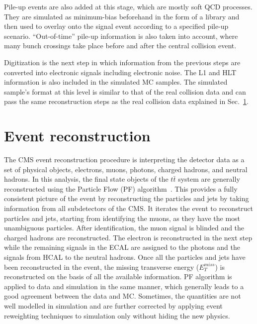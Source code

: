 Pile-up events are also added at this stage, which are mostly soft QCD processes. They are simulated as minimum-bias beforehand in the form of a library and then used to overlay onto the signal event according to a specified pile-up scenario. ``Out-of-time'' pile-up information is also taken into account, where many bunch crossings take place before and after the central collision event. 

Digitization is the next step in which information from the previous steps are converted into electronic signals including electronic noise. The L1 and HLT information is also included in the simulated MC samples. The simulated sample's format at this level is similar to that of the real collision data and can pass the same reconstruction steps as the real collision data explained in Sec.~\ref{sec_recons}.  

\section{Event reconstruction}\label{sec_recons}
The CMS event reconstruction procedure is interpreting the detector data as a set of physical objects, electrons, muons, photons, charged hadrons, and neutral hadrons. In this analysis, the final state objects of the $t\bar t$ system are generally reconstructed using the Particle Flow (PF) algorithm~\cite{Beaudette:2014cea}. This provides a fully consistent picture of the event by reconstructing the particles and jets by taking information from all subdetectors of the CMS. It iterates the event to reconstruct particles and jets, starting from identifying the muons, as they have the most unambiguous particles. After identification, the muon signal is blinded and the charged hadrons are reconstructed. The electron is reconstructed in the next step while the remaining signals in the ECAL are assigned to the photons and the signals from HCAL to the neutral hadrons. Once all the particles and jets have been reconstructed in the event, the missing transverse energy ($E_T^{miss}$) is reconstructed on the basis of all the available information. PF algorithm is applied to data and simulation in the same manner, which generally leads to a good agreement between the data and MC. Sometimes, the quantities are not well modelled in simulation and are further corrected by applying event reweighting techniques to simulation only without hiding the new physics.   
